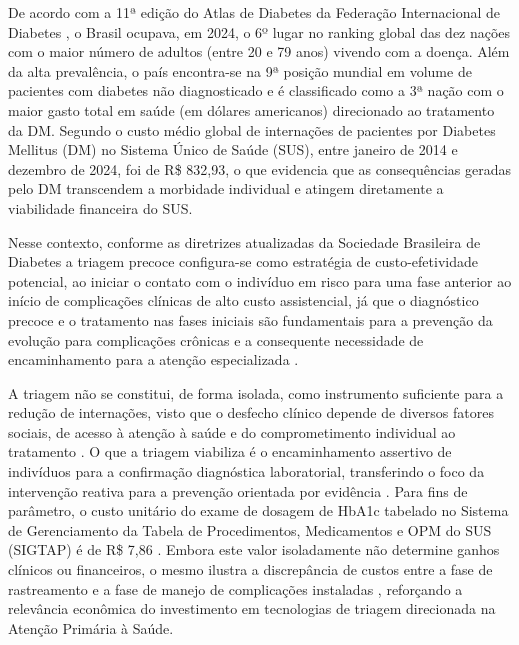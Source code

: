 De acordo com a 11ª edição do Atlas de Diabetes da Federação Internacional de Diabetes \cite{IDF2025}, o Brasil ocupava, em 2024, o 6º lugar no ranking global das dez nações com o maior número de adultos (entre 20 e 79 anos) vivendo com a doença. Além da alta prevalência, o país encontra-se na 9ª posição mundial em volume de pacientes com diabetes não diagnosticado e é classificado como a 3ª nação com o maior gasto total em saúde (em dólares americanos) direcionado ao tratamento da DM. Segundo \textcite{bezerra2025morbidade} o custo médio global de internações de pacientes por Diabetes Mellitus (DM) no Sistema Único de Saúde (SUS), entre janeiro de 2014 e dezembro de 2024, foi de R\$ 832,93, o que evidencia que as consequências geradas pelo DM transcendem a morbidade individual e atingem diretamente a viabilidade financeira do SUS. 

Nesse contexto, conforme as diretrizes atualizadas da Sociedade Brasileira de Diabetes \cite{SBD2025} a triagem precoce configura-se como estratégia de custo-efetividade potencial, ao iniciar o contato com o indivíduo em risco para uma fase anterior ao início de complicações clínicas de alto custo assistencial, já que o diagnóstico precoce e o tratamento nas fases iniciais são fundamentais para a prevenção da evolução para complicações crônicas e a consequente necessidade de encaminhamento para a atenção especializada \cite{Rodacki2025}.

A triagem não se constitui, de forma isolada, como instrumento suficiente para a redução de internações, visto que o desfecho clínico depende de diversos fatores sociais, de acesso à atenção à saúde e do comprometimento individual ao tratamento \cite{geremia2020atenccao}. O que a triagem viabiliza é o encaminhamento assertivo de indivíduos para a confirmação diagnóstica laboratorial, transferindo o foco da intervenção reativa para a prevenção orientada por evidência \cite{brasil2013}. Para fins de parâmetro, o custo unitário do exame de dosagem de HbA1c tabelado no Sistema de Gerenciamento da Tabela de Procedimentos, Medicamentos e OPM do SUS (SIGTAP) é de R\$ 7,86 \cite{sigtap_hemoglobina_2026}. Embora este valor isoladamente não determine ganhos clínicos ou financeiros, o mesmo ilustra a discrepância de custos entre a fase de rastreamento e a fase de manejo de complicações instaladas \cite{bezerra2025morbidade}, reforçando a relevância econômica do investimento em tecnologias de triagem direcionada na Atenção Primária à Saúde.

